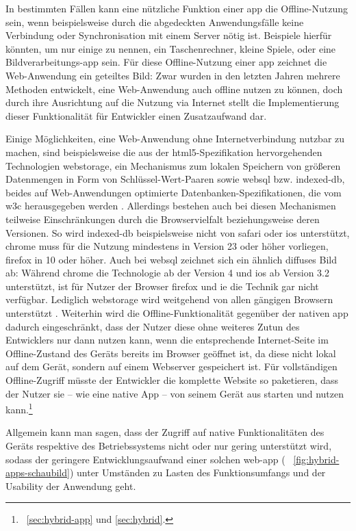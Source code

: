 In bestimmten Fällen kann eine nützliche Funktion einer \gls{app} die Offline-Nutzung sein, wenn beispielsweise durch die abgedeckten Anwendungsfälle keine Verbindung oder Synchronisation mit einem Server nötig ist. Beispiele hierfür könnten, um nur einige zu nennen, ein Taschenrechner, kleine Spiele, oder eine Bildverarbeitungs-\gls{app} sein. 
Für diese Offline-Nutzung einer \gls{app} zeichnet die Web-Anwendung ein geteiltes Bild: Zwar wurden in den letzten Jahren mehrere Methoden entwickelt, eine Web-Anwendung auch offline nutzen zu können, doch durch ihre Ausrichtung auf die Nutzung via Internet stellt die Implementierung dieser Funktionalität für Entwickler einen Zusatzaufwand dar. 

Einige Möglichkeiten, eine Web-Anwendung ohne Internetverbindung nutzbar zu machen, sind beispielsweise die aus der \gls{html5}-Spezifikation hervorgehenden Technologien \gls{webstorage}, ein Mechanismus zum lokalen Speichern von größeren Datenmengen in Form von Schlüssel-Wert-Paaren \cite{w3c_webstorage} sowie \gls{websql} bzw. \gls{indexed-db}, beides auf Web-Anwendungen optimierte Datenbanken-Spezifikationen, die vom \gls{w3c} herausgegeben werden \cite{w3c_websql, w3c_indexedDB}.
Allerdings bestehen auch bei diesen Mechanismen teilweise Einschränkungen durch die Browservielfalt beziehungsweise deren Versionen. So wird \gls{indexed-db} beispielsweise nicht von \gls{safari} oder \gls{ios} unterstützt, \gls{chrome} muss für die Nutzung mindestens in Version 23 oder höher vorliegen, \gls{firefox} in 10 oder höher. 
Auch bei \gls{websql} zeichnet sich ein ähnlich diffuses Bild ab: Während \gls{chrome} die Technologie ab der Version 4 und \gls{ios} ab Version 3.2 unterstützt, ist für Nutzer der Browser \gls{firefox} und \gls{ie} die Technik gar nicht verfügbar.
Lediglich \gls{webstorage} wird weitgehend von allen gängigen Browsern unterstützt \cite{html5-rocks_offline}.
Weiterhin wird die Offline-Funktionalität gegenüber der nativen \gls{app} dadurch eingeschränkt, dass der Nutzer diese ohne weiteres Zutun des Entwicklers nur dann nutzen kann, wenn die entsprechende Internet-Seite im Offline-Zustand des Geräts bereits im Browser geöffnet ist, da diese nicht lokal auf dem Gerät, sondern auf einem Webserver gespeichert ist.
Für vollständigen Offline-Zugriff müsste der Entwickler die komplette Website so paketieren, dass der Nutzer sie -- wie eine native App -- von seinem Gerät aus starten und nutzen kann.\footnote{\seename\ \autoref{sec:hybrid-app} und \ref{sec:hybrid}.}

Allgemein kann man sagen, dass der Zugriff auf native Funktionalitäten des Geräts respektive des Betriebssystems nicht oder nur gering unterstützt wird, sodass der geringere Entwicklungsaufwand einer solchen \gls{web-app} (\seename~ \autoref{fig:hybrid-apps-schaubild}) unter Umständen zu Lasten des Funktionsumfangs und der Usability der Anwendung geht.

